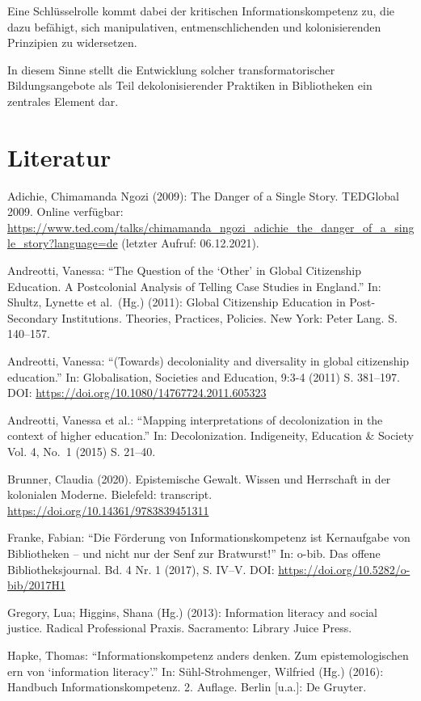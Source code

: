 \documentclass[a4paper,
fontsize=11pt,
oneside,
numbers=noperiodatend,
parskip=half-,
bibliography=totoc,
final
]{scrartcl}
\begin{document}
Eine Schlüsselrolle kommt dabei der kritischen Informationskompetenz zu,
die dazu befähigt, sich manipulativen, entmenschlichenden und
kolonisierenden Prinzipien zu widersetzen.

In diesem Sinne stellt die Entwicklung solcher transformatorischer
Bildungsangebote als Teil dekolonisierender Praktiken in Bibliotheken
ein zentrales Element dar.

\hypertarget{literatur}{%
\section{Literatur}\label{literatur}}

Adichie, Chimamanda Ngozi (2009): The Danger of a Single Story.
TEDGlobal 2009. Online verfügbar:
\url{https://www.ted.com/talks/chimamanda_ngozi_adichie_the_danger_of_a_single_story?language=de}
(letzter Aufruf: 06.12.2021).

Andreotti, Vanessa: \enquote{The Question of the \enquote*{Other} in
Global Citizenship Education. A Postcolonial Analysis of Telling Case
Studies in England.} In: Shultz, Lynette et al.~(Hg.) (2011): Global
Citizenship Education in Post-Secondary Institutions. Theories,
Practices, Policies. New York: Peter Lang. S. 140--157.

Andreotti, Vanessa: \enquote{(Towards) decoloniality and diversality in
global citizenship education.} In: Globalisation, Societies and
Education, 9:3-4 (2011) S. 381--197. DOI:
\url{https://doi.org/10.1080/14767724.2011.605323}

Andreotti, Vanessa et al.: \enquote{Mapping interpretations of
decolonization in the context of higher education.} In: Decolonization.
Indigeneity, Education \& Society Vol. 4, No.~1 (2015) S. 21--40.

Brunner, Claudia (2020). Epistemische Gewalt. Wissen und Herrschaft in
der kolonialen Moderne. Bielefeld: transcript.
\url{https://doi.org/10.14361/9783839451311}

Franke, Fabian: \enquote{Die Förderung von Informationskompetenz ist
Kernaufgabe von Bibliotheken -- und nicht nur der Senf zur Bratwurst!}
In: o-bib. Das offene Bibliotheksjournal. Bd. 4 Nr. 1 (2017), S. IV--V.
DOI: \url{https://doi.org/10.5282/o-bib/2017H1}

Gregory, Lua; Higgins, Shana (Hg.) (2013): Information literacy and
social justice. Radical Professional Praxis. Sacramento: Library Juice
Press.

Hapke, Thomas: \enquote{Informationskompetenz anders denken. Zum
epistemologischen ern von \enquote*{information literacy}.} In:
Sühl-Strohmenger, Wilfried (Hg.) (2016): Handbuch Informationskompetenz.
2. Auflage. Berlin {[}u.a.{]}: De Gruyter.
\end{document}
